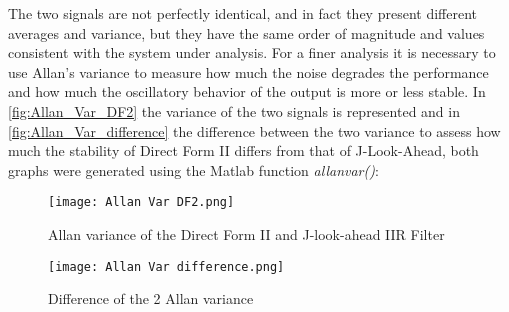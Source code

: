 The two signals are not perfectly identical, and in fact they present different averages and variance, but they have the same order of magnitude and values consistent with the system under analysis. For a finer analysis it is necessary to use Allan's variance to measure how much the noise degrades the performance and how much the oscillatory behavior of the output is more or less stable. In \autoref{fig:Allan_Var_DF2} the variance of the two signals is represented and in \autoref{fig:Allan_Var_difference} the difference between the two variance to assess how much the stability of Direct Form II differs from that of J-Look-Ahead, both graphs were generated using the Matlab function \textit{allanvar()}:

\begin{figure}[ht]
	\centering
	\begin{minipage}[b]{0.44\linewidth}
		\centering
		\texttt{[image: Allan Var DF2.png]}
		\caption{Allan variance of the Direct Form II  and J-look-ahead IIR Filter}
		\label{fig:Allan_Var_DF2}
	\end{minipage}
	\hspace{0.5cm}
	\begin{minipage}[b]{0.48\linewidth}
		\centering
		\texttt{[image: Allan Var difference.png]}
		\caption{Difference of the 2 Allan variance}
		\label{fig:Allan_Var_difference}
	\end{minipage}
\end{figure}